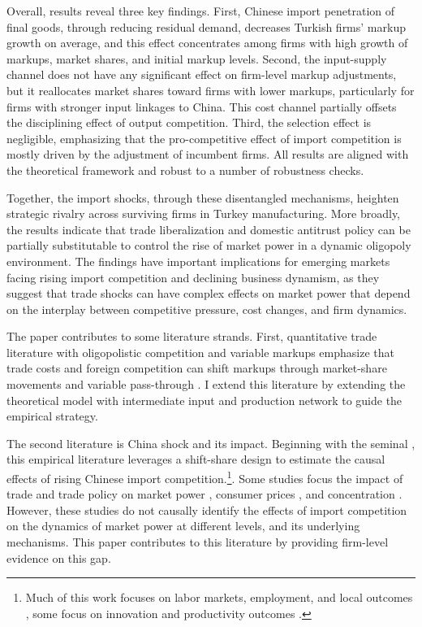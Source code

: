 \documentclass[12pt]{article}
\begin{document}
Overall, results reveal three key findings. First, Chinese import penetration of final goods, through reducing residual demand, decreases Turkish firms' markup growth on average, and this effect concentrates among firms with high growth of markups, market shares, and initial markup levels. Second, the input-supply channel does not have any significant effect on firm-level markup adjustments, but it reallocates market shares toward firms with lower markups, particularly for firms with stronger input linkages to China. This cost channel partially offsets the disciplining effect of output competition. Third, the selection effect is negligible, emphasizing that the pro-competitive effect of import competition is mostly driven by the adjustment of incumbent firms. All results are aligned with the theoretical framework and robust to a number of robustness checks. 

Together, the import shocks, through these disentangled mechanisms, heighten strategic rivalry across surviving firms in Turkey manufacturing. More broadly, the results indicate that trade liberalization and domestic antitrust policy can be partially substitutable to control the rise of market power in a dynamic oligopoly environment. The findings have important implications for emerging markets facing rising import competition and declining business dynamism, as they suggest that trade shocks can have complex effects on market power that depend on the interplay between competitive pressure, cost changes, and firm dynamics.

The paper contributes to some literature strands. First, quantitative trade literature with oligopolistic competition and variable markups emphasize that trade costs and foreign competition can shift markups through market-share movements and variable pass-through \parencite{deblasUnderstandingMarkupsOpen2015,atkesonPricingtoMarketTradeCosts2008,gaubertGranularComparativeAdvantage2021}. I extend this literature by extending the theoretical model with intermediate input and production network to guide the empirical strategy.

The second literature is China shock and its impact. Beginning with the seminal \autocite{autorChinaSyndromeLocal2013}, this empirical literature leverages a shift-share design to estimate the causal effects of rising Chinese import competition.\footnote{Much of this work focuses on labor markets, employment, and local outcomes \parencite{autorTradeAdjustmentWorkerLevel2014, acemogluImportCompetitionGreat2016,pierceSurprisinglySwiftDecline2016}, some focus on innovation and productivity outcomes \parencite{aghionOpposingFirmLevelResponses2024, bloomTradeInducedTechnical2016}.}. Some studies focus the impact of trade and trade policy on market power \parencite{deloeckerPricesMarkupsTrade2016,impullittiGlobalizationMarketPower2023}, consumer prices \parencite{jaravelWhatArePrice}, and concentration \parencite{amitiUSMarketConcentration2025}. However, these studies do not causally identify the effects of import competition on the dynamics of market power at different levels, and its underlying mechanisms. This paper contributes to this literature by providing firm-level evidence on this gap.
\end{document}
